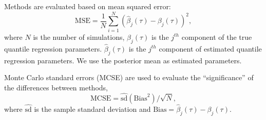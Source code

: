 \documentclass[12pt]{article}
\begin{document}
Methods are evaluated based on mean squared error:
\begin{displaymath}
  \mbox{MSE}  =  \frac{1}{N}\sum_{i = 1}^N (\hat{\beta}_j(\tau) -
  \beta_j(\tau))^2 ,
\end{displaymath}
where $N$ is the number of simulations, $\beta_j(\tau)$ is the
$j^{th}$ component of the true quantile regression
parameters. $\hat{\beta}_j(\tau)$ is the $j^{th}$ component of
estimated quantile regression parameters. We use the posterior
mean as estimated parameters.

Monte Carlo standard errors (MCSE) are used to evaluate the
``significance'' of the differences between methods,
\begin{displaymath}
  \mbox{MCSE} = \hat{\mbox{sd}}(\mbox{Bias}^2)/\sqrt{N},
\end{displaymath}
where $\hat{\mbox{sd}}$ is the sample standard deviation and
$\mbox{Bias} = \hat{\beta}_{j}(\tau) - \beta_{j}(\tau)$.
\end{document}
